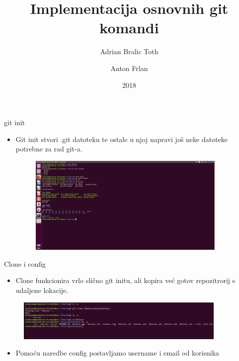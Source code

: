\documentclass{beamer}
\title{Implementacija osnovnih git komandi}
\author{Adrian Bralic Toth \and Anton Frlan}
\institute{Tehnički Fakultet Rijeka}
\date{2018}
\begin{document}
\frame{\titlepage}

\begin{frame}{git init}

\begin{itemize}
	\setlength\itemsep{2em}
	\item Git init stvori .git datoteku te ostale u njoj napravi još neke datoteke potrebne za rad git-a.
	\begin{figure}
\centering
\includegraphics[width=0.9\textwidth]{./slike/git_datoteka.png}
\end{figure}
\end{itemize}

\end{frame}

\begin{frame}{Clone i config}

\begin{itemize}
	\item Clone funkcionira vrlo slično git initu, ali kopira već gotov repozitrorij s udaljene lokacije.
\end{itemize}
	\begin{figure}
		\includegraphics[width=0.9\textwidth]{./slike/b.png}
	\end{figure}
\begin{itemize}
	\item Pomoću naredbe config postavljamo username i email od korisnika
\end{itemize}

\end{frame}
\end{document}

